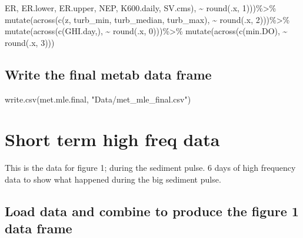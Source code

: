 \documentclass[
  letterpaper,
  DIV=11,
  numbers=noendperiod]{scrartcl}
\newenvironment{Shaded}{\begin{snugshade}}{\end{snugshade}}
\newcommand{\DecValTok}[1]{\textcolor[rgb]{0.68,0.00,0.00}{#1}}
\newcommand{\FunctionTok}[1]{\textcolor[rgb]{0.28,0.35,0.67}{#1}}
\newcommand{\NormalTok}[1]{\textcolor[rgb]{0.00,0.23,0.31}{#1}}
\newcommand{\SpecialCharTok}[1]{\textcolor[rgb]{0.37,0.37,0.37}{#1}}
\newcommand{\StringTok}[1]{\textcolor[rgb]{0.13,0.47,0.30}{#1}}
\begin{document}
\begin{Shaded}
\begin{Highlighting}[]
\NormalTok{        ER, ER.lower, ER.upper, NEP, K600.daily, SV.cms),}
      \SpecialCharTok{\textasciitilde{}} \FunctionTok{round}\NormalTok{(.x, }\DecValTok{1}\NormalTok{)))}\SpecialCharTok{\%\textgreater{}\%}
   \FunctionTok{mutate}\NormalTok{(}\FunctionTok{across}\NormalTok{(}\FunctionTok{c}\NormalTok{(z, turb\_min, turb\_median, turb\_max), }\SpecialCharTok{\textasciitilde{}} \FunctionTok{round}\NormalTok{(.x, }\DecValTok{2}\NormalTok{)))}\SpecialCharTok{\%\textgreater{}\%}
  \FunctionTok{mutate}\NormalTok{(}\FunctionTok{across}\NormalTok{(}\FunctionTok{c}\NormalTok{(GHI.day,), }\SpecialCharTok{\textasciitilde{}} \FunctionTok{round}\NormalTok{(.x, }\DecValTok{0}\NormalTok{)))}\SpecialCharTok{\%\textgreater{}\%}
  \FunctionTok{mutate}\NormalTok{(}\FunctionTok{across}\NormalTok{(}\FunctionTok{c}\NormalTok{(min.DO), }\SpecialCharTok{\textasciitilde{}} \FunctionTok{round}\NormalTok{(.x, }\DecValTok{3}\NormalTok{)))}
\end{Highlighting}
\end{Shaded}

\normalsize

\subsection{Write the final metab data
frame}\label{write-the-final-metab-data-frame}

\small

\begin{Shaded}
\begin{Highlighting}[]
\FunctionTok{write.csv}\NormalTok{(met.mle.final, }\StringTok{"Data/met\_mle\_final.csv"}\NormalTok{)}
\end{Highlighting}
\end{Shaded}

\normalsize

\section{Short term high freq data}\label{short-term-high-freq-data}

This is the data for figure 1; during the sediment pulse. 6 days of high
frequency data to show what happened during the big sediment pulse.

\subsection{Load data and combine to produce the figure 1 data
frame}\label{load-data-and-combine-to-produce-the-figure-1-data-frame}
\end{document}
